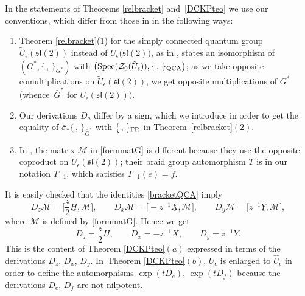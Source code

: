\documentclass[pdftex]{sigma}%
\numberwithin{equation}{section}
\numberwithin{figure}{section}
\newcommand{\e}{\epsilon}
\begin{document}
\begin{remk} \label{convdif}
In the statements of Theorems \ref{relbracket} and~\ref{DCKPteo} we use our conventions, which differ from those in \cite{DC-K-P1,DC-K-P2} in the following ways:

\begin{enumerate}\itemsep=0pt

\item[$(i)$] Theorem \ref{relbracket}(1) for the simply connected quantum group $\tilde U_\epsilon({\mathfrak{sl}}(2))$ instead of $U_\epsilon\big({\mathfrak{sl}}(2)\big)$, as in \cite{DC-K-P1,DC-K-P2}, states an isomorphism of $(G^*,\{\, ,\, \}_{G^*})$ with $\big(\!\operatorname{Spec} (\mathcal{Z}_0(\tilde U_\epsilon)),\{\, ,\, \}_{\rm QCA}\big)$; as we take opposite comultiplications on $\tilde U_\epsilon({\mathfrak{sl}}(2))$, we get opposite multiplications of $G^*$ \big(whence~$\bar G^*$ for $U_\epsilon({\mathfrak{sl}}(2))\big)$.

\item[$(ii)$] Our derivations $D_a$ differ by a sign, which we introduce in order to get the equality of $\bar \sigma_*\{\, ,\, \}_{\bar G^*}$ with $\{\, ,\, \}_{\rm FR}$ in Theorem~\ref{relbracket}$(2)$.

\item[$(iii)$] In \cite{DC-K,DC-K-P1,DC-K-P2}, the matrix ${\mathcal M}$ in \eqref{formmatG} is different because they use the opposite coproduct on $\tilde U_\epsilon({\mathfrak{sl}}(2))$; their braid group automorphism $T$ is in our notation $T_{-1}$, which satisfies $T_{-1}(e)=f$.
\end{enumerate}
\end{remk}
It is easily checked that the identities \eqref{bracketQCA} imply
\begin{equation}\label{DonM}
D_z\mathcal{M} = \bigg[\frac{z}{2}\underline{H},\mathcal{M}\bigg], \qquad
D_x\mathcal{M} = \big[{-}z^{-1}\underline{X},\mathcal{M}\big],\qquad
D_y\mathcal{M} = \big[z^{-1}\underline{Y},\mathcal{M}\big],
\end{equation}
where $\mathcal{M}$ is defined by \eqref{formmatG}. Hence we get
\begin{equation*}%
D_z = \frac{z}{2}\underline{H}, \qquad
D_x = -z^{-1}\underline{X},\qquad
D_y = z^{-1}\underline{Y}.
\end{equation*}
This is the content of Theorem \ref{DCKPteo}$(a)$ expressed in terms of the derivations $D_z$, $D_x$, $D_y$. In~Theo\-rem \ref{DCKPteo}$(b)$, $U_\epsilon$ is enlarged to $\hat{U}_\e$ in order to define the automorphisms $\exp(tD_e)$, $\exp(tD_f)$ because the derivations $D_e$, $D_f$ are not nilpotent.
\end{document}
